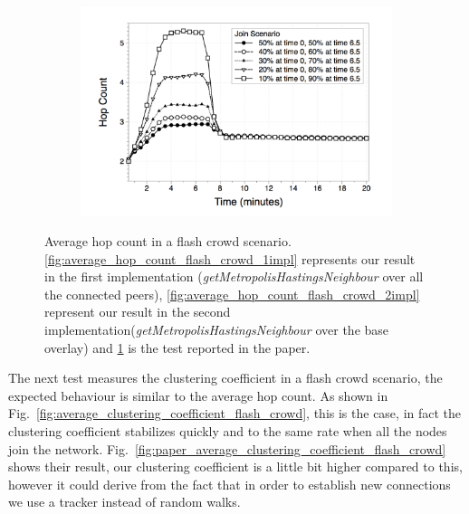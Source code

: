 \begin{figure}
\begin{subfigure}{.5\textwidth}
  \includegraphics[keepaspectratio=true, width=1\linewidth]{images/paper_average_hop_count_flash_crowd}
  \caption{}
  \label{fig:paper_average_hop_count_flash_crowd}
\end{subfigure}
\caption{Average hop count in a flash crowd scenario. \ref{fig:average_hop_count_flash_crowd_1impl} represents our result in the first implementation (\textit{getMetropolisHastingsNeighbour} over all the connected peers), \ref{fig:average_hop_count_flash_crowd_2impl} represent our result in the second implementation(\textit{getMetropolisHastingsNeighbour} over the base overlay) and \ref{fig:paper_average_hop_count_flash_crowd} is the test reported in the paper.}
\label{fig:robustness_hop_count_flash_crowd}
\end{figure}

The next test measures the clustering coefficient in a flash crowd scenario, the expected behaviour is similar to the average hop count. As shown in Fig.~\ref{fig:average_clustering_coefficient_flash_crowd}, this is the case, in fact the clustering coefficient stabilizes quickly and to the same rate when all the nodes join the network. Fig.~\ref{fig:paper_average_clustering_coefficient_flash_crowd} shows their result, our clustering coefficient is a little bit higher compared to this, however it could derive from the fact that in order to establish new connections we use a tracker instead of random walks.

